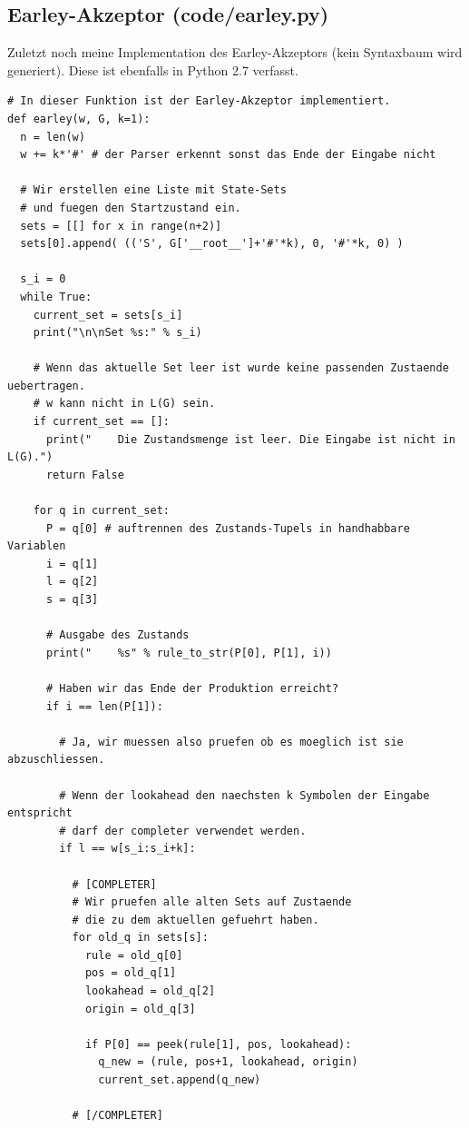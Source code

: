 \documentclass[12pt,a4paper]{article}
\theoremstyle{definition}
\begin{document}
	\subsection{Earley-Akzeptor (code/earley.py)}
		Zuletzt noch meine Implementation des Earley-Akzeptors (kein Syntaxbaum wird generiert). Diese ist ebenfalls in Python 2.7 verfasst.

		\singlespacing
		\begin{verbatim}
# In dieser Funktion ist der Earley-Akzeptor implementiert.
def earley(w, G, k=1):
  n = len(w)
  w += k*'#' # der Parser erkennt sonst das Ende der Eingabe nicht

  # Wir erstellen eine Liste mit State-Sets
  # und fuegen den Startzustand ein.
  sets = [[] for x in range(n+2)]
  sets[0].append( (('S', G['__root__']+'#'*k), 0, '#'*k, 0) )

  s_i = 0
  while True:
    current_set = sets[s_i]
    print("\n\nSet %s:" % s_i)

    # Wenn das aktuelle Set leer ist wurde keine passenden Zustaende uebertragen.
    # w kann nicht in L(G) sein.
    if current_set == []:
      print("    Die Zustandsmenge ist leer. Die Eingabe ist nicht in L(G).")
      return False

    for q in current_set:
      P = q[0] # auftrennen des Zustands-Tupels in handhabbare Variablen
      i = q[1]
      l = q[2]
      s = q[3]

      # Ausgabe des Zustands
      print("    %s" % rule_to_str(P[0], P[1], i))

      # Haben wir das Ende der Produktion erreicht?
      if i == len(P[1]):

        # Ja, wir muessen also pruefen ob es moeglich ist sie abzuschliessen.
        
        # Wenn der lookahead den naechsten k Symbolen der Eingabe entspricht
        # darf der completer verwendet werden.
        if l == w[s_i:s_i+k]:

          # [COMPLETER]
          # Wir pruefen alle alten Sets auf Zustaende 
          # die zu dem aktuellen gefuehrt haben.
          for old_q in sets[s]:
            rule = old_q[0]
            pos = old_q[1]
            lookahead = old_q[2]
            origin = old_q[3]

            if P[0] == peek(rule[1], pos, lookahead):
              q_new = (rule, pos+1, lookahead, origin)
              current_set.append(q_new)
              
          # [/COMPLETER]


\end{verbatim}
\end{document}
